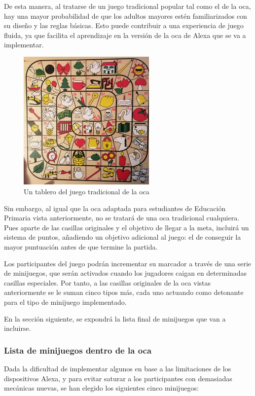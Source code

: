 De esta manera, al tratarse de un juego tradicional popular tal como el de la oca, hay una mayor probabilidad de que los adultos mayores estén familiarizados con su diseño y las reglas básicas. Esto puede contribuir a una experiencia de juego fluida, ya que facilita el aprendizaje en la versión de la oca de Alexa que se va a implementar.

\begin{figure}[H]
	\centering
	\includegraphics[width=0.6\textwidth]{imgs/oca-tradicional.jpg}
	\caption{Un tablero del juego tradicional de la oca}
	\label{fig:oca-tradicional}
\end{figure}

Sin embargo, al igual que la oca adaptada para estudiantes de Educación Primaria vista anteriormente, no se tratará de una oca tradicional cualquiera. Pues aparte de las casillas originales y el objetivo de llegar a la meta, incluirá un sistema de puntos, añadiendo un objetivo adicional al juego: el de conseguir la mayor puntuación antes de que termine la partida.

Los participantes del juego podrán incrementar su marcador a través de una serie de minijuegos, que serán activados cuando los jugadores caigan en determinadas casillas especiales. Por tanto, a las casillas originales de la oca vistas anteriormente se le suman cinco tipos más, cada uno actuando como detonante para el tipo de minijuego implementado.

En la sección siguiente, se expondrá la lista final de minijuegos que van a incluirse.

\subsubsection{Lista de minijuegos dentro de la oca}
Dada la dificultad de implementar algunos en base a las limitaciones de los dispositivos Alexa, y para evitar saturar a los participantes con demasiadas mecánicas nuevas, se han elegido los siguientes cinco minijuegos:

